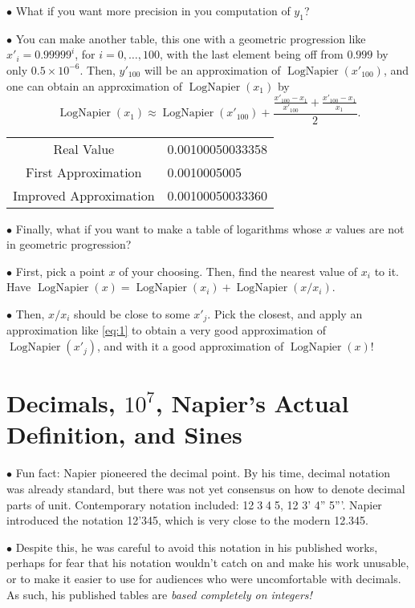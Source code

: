 \documentclass{article}
\newcommand\point[1]{\noindent \hspace{\labelsep} $\bullet$ #1 \smallskip}
\DeclareMathOperator{\lognap}{LogNapier}
\begin{document}
\point{What if you want more precision in you computation of $y_1$?}

\point{You can make another table, this one with a geometric progression like $x'_i = 0.99999^i$, for $i = 0, \dots, 100$, with the last element being off from $0.999$ by only $0.5 \times 10^{-6}$. Then, $y'_{100}$ will be an approximation of $\lognap(x'_{100})$, and one can obtain an approximation of $\lognap(x_1)$ by
\begin{equation}\label{eq:1}
\lognap(x_1) \approx \lognap(x'_{100}) + \frac{\frac{x'_{100}-x_1}{x'_{100}} + \frac{x'_{100}-x_1}{x_1}}2.
\end{equation}}

\begin{center}
\begin{tabular}{ c | l }
 Real Value & 0.00100050033358 \\ 
 First Approximation & 0.0010005005 \\  
 Improved Approximation & 0.00100050033360  
\end{tabular}
\end{center}

\point{Finally, what if you want to make a table of logarithms whose $x$ values are not in geometric progression?}

\point{First, pick a point $x$ of your choosing. Then, find the nearest value of $x_i$ to it. Have $\lognap(x) = \lognap(x_i) + \lognap(x/x_i)$.}

\point{Then, $x/x_i$ should be close to some $x'_j$. Pick the closest, and apply an approximation like \eqref{eq:1} to obtain a very good approximation of $\lognap(x'_j)$, and with it a good approximation of $\lognap(x)$!}

\section{Decimals, $10^7$, Napier's Actual Definition, and Sines}

\point{Fun fact: Napier pioneered the decimal point. By his time, decimal notation was already standard, but there was not yet consensus on how to denote decimal parts of unit. Contemporary notation included: {12\textcircled{\raisebox{-0.9pt}{0}}3\textcircled{\raisebox{-0.9pt}{1}}4\textcircled{\raisebox{-0.9pt}{2}}5}, 12 3' 4'' 5'''. Napier introduced the notation 12'345, which is very close to the modern 12.345.}

\point{Despite this, he was careful to avoid this notation in his published works, perhaps for fear that his notation wouldn't catch on and make his work unusable, or to make it easier to use for audiences who were uncomfortable with decimals. As such, his published tables are \emph{based completely on integers!}}
\end{document}
